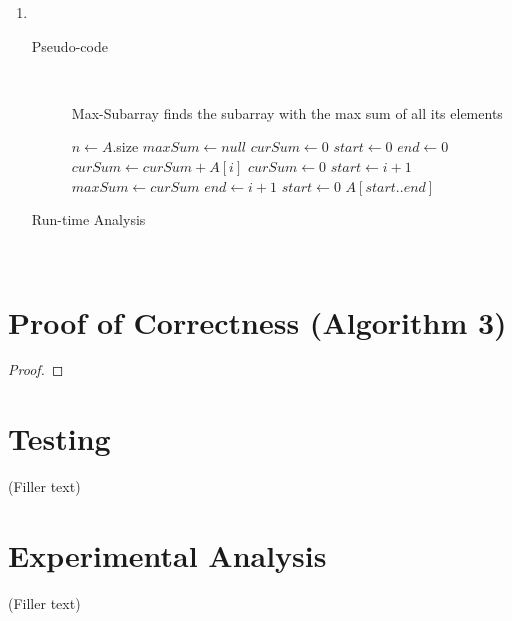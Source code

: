 \documentclass[paper=a4, fontsize=11pt]{scrartcl} %
\numberwithin{equation}{section} %
\numberwithin{figure}{section} %
\numberwithin{table}{section} %
\begin{document}
\begin{enumerate}[label=\bfseries Algorithm \arabic*:]
    \item \hfill \\
    \begin{description}
        \item[Pseudo-code] \hfill \\
        \begin{algorithmc}
            \caption{Max-Subarray finds the subarray with the max sum of all its elements}
                \State $n \gets A$.size
                \State $maxSum \gets null$
                \State $curSum \gets 0$
                \State $start \gets 0$
                \State $end \gets 0$
                    \State $curSum \gets curSum + A[i]$
                        \State $curSum \gets 0$
                        \State $start \gets i + 1$
                    \EndIf
                        \State $maxSum \gets curSum$
                        \State $end \gets i + 1$
                    \EndIf
                \EndFor
                    \State $start \gets 0$
                \EndIf
                \State \Return $A[start..end]$
            \EndFunction
        \end{algorithmc}
        \item[Run-time Analysis] \hfill \\
    \end{description}
\end{enumerate}

\section{Proof of Correctness (Algorithm 3)}
\begin{proof}
\end{proof}

\section{Testing}
(Filler text)

\section{Experimental Analysis}
(Filler text)
\end{document}
